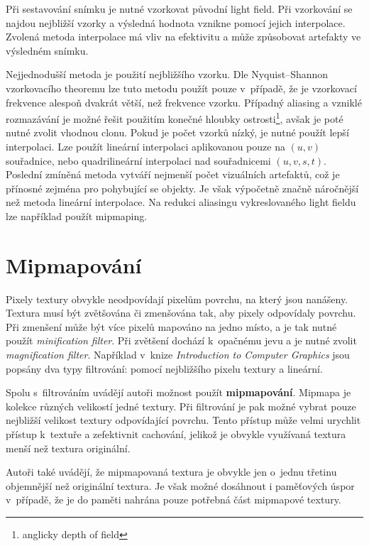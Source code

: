 Při sestavování snímku je nutné vzorkovat původní light field. Při vzorkování se najdou nejbližší vzorky a výsledná hodnota vznikne pomocí jejich interpolace. Zvolená metoda interpolace má vliv na efektivitu a může způsobovat artefakty ve výsledném snímku. 

Nejjednodušší metoda je použití nejbližšího vzorku. Dle Nyquist–Shannon vzorkovacího theoremu\cite{por2019nyquist} lze tuto metodu použít pouze v~případě, že je vzorkovací frekvence alespoň dvakrát větší, než frekvence vzorku. Případný aliasing a vzniklé rozmazávání je možné řešit použitím konečné hloubky ostrosti\footnote{anglicky depth of field}, avšak je poté nutné zvolit vhodnou clonu. Pokud je počet vzorků nízký, je nutné použít lepší interpolaci. Lze použít lineární interpolaci aplikovanou pouze na \((u,v)\) souřadnice, nebo quadrilineární interpolaci nad souřadnicemi \((u,v,s,t)\). Poslední zmíněná metoda vytváří nejmenší počet vizuálních artefaktů, což je přínosné zejména pro pohybující se objekty. Je však výpočetně značně náročnější než metoda lineární interpolace. Na redukci aliasingu vykreslovaného light fieldu lze například použít mipmaping.


\section{Mipmapování}
Pixely textury obvykle neodpovídají pixelům povrchu, na který jsou nanášeny. Textura musí být zvětšována či zmenšována tak, aby pixely odpovídaly povrchu. Při zmenšení může být více pixelů mapováno na jedno místo, a je tak nutné použít \emph{minification filter}. Při zvětšení dochází k~opačnému jevu a je nutné zvolit \emph{magnification  filter}. Například v~knize \emph{Introduction to Computer Graphics} \cite{foley1994introduction} jsou popsány dva typy filtrování: pomocí nejbližšího pixelu textury a lineární. 

\pagebreak

Spolu s~filtrováním uvádějí autoři možnost použít \textbf{mipmapování}. Mipmapa je kolekce různých velikostí jedné textury. Při filtrování je pak možné vybrat pouze nejbližší velikost textury odpovídající povrchu. Tento přístup může velmi urychlit přístup k~textuře a zefektivnit cachování, jelikož je obvykle využívaná textura menší než textura originální. 

Autoři také uvádějí, že mipmapovaná textura je obvykle jen o~jednu třetinu objemnější než originální textura. Je však možné dosáhnout i paměťových úspor v~případě, že je do paměti nahrána pouze potřebná část mipmapové textury. 

